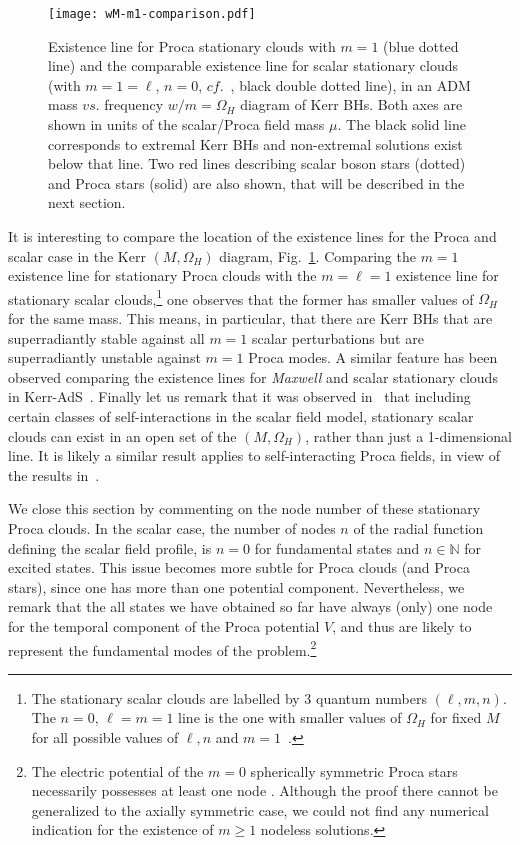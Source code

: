 \begin{figure}[h!]
  \begin{center}
    \texttt{[image: wM-m1-comparison.pdf]}
  \end{center}
 \caption{Existence line for Proca stationary clouds with $m=1$ (blue dotted line) and the comparable existence line for scalar stationary clouds (with $m=1=\ell$, $n=0$, $cf.$~\cite{Benone:2014ssa}, black double dotted line), in an ADM mass $vs.$ frequency $w/m=\Omega_H$ diagram of Kerr BHs. Both axes are shown in units of the scalar/Proca field mass $\mu$. The black solid line corresponds to extremal Kerr BHs and non-extremal solutions exist below that line. Two red lines describing scalar boson stars (dotted) and Proca stars (solid) are also shown, that will be described in the next section.}
  \label{clouds}
\end{figure}

It is interesting to compare the location of the existence lines for the Proca and scalar case in the Kerr $(M,\Omega_H)$ diagram, Fig.~\ref{clouds}. Comparing the $m=1$ existence line for stationary Proca clouds with the $m=\ell=1$ existence line for stationary scalar clouds,\footnote{The stationary scalar clouds are labelled by 3 quantum numbers $(\ell,m,n)$. The $n=0$, $\ell=m=1$ line is the one with smaller values of $\Omega_H$ for fixed $M$ for all possible values of $\ell,n$ and $m=1$~\cite{Benone:2014ssa}.} one observes that the former has smaller values of $\Omega_H$ for the same mass. This means, in particular, that there are Kerr BHs that are superradiantly stable against all $m=1$ scalar perturbations but are superradiantly unstable against $m=1$ Proca modes. A similar feature has been observed comparing the existence lines for \textit{Maxwell} and scalar stationary clouds in Kerr-AdS~\cite{Wang:2015fgp}. Finally let us remark that it was observed in~\cite{Herdeiro:2014pka} that including certain classes of self-interactions in the scalar field model, stationary scalar clouds can exist in an open set of the $(M,\Omega_H)$, rather than just a 1-dimensional line.  It is likely a similar result applies to self-interacting Proca fields, in view of the results in~\cite{Loginov:2015rya}.




We close this section by commenting on the node number of these stationary Proca clouds. 
In the scalar case, the number of nodes $n$ of the radial function defining the scalar field profile, 
is $n=0$ for fundamental states and $n\in \mathbb{N}$ for excited states. 
This issue becomes more subtle for Proca clouds (and Proca stars), 
since one has more than one potential component. Nevertheless, we remark that the all states we have obtained so far have always (only)
one node for the temporal component of the Proca potential  $V$, and thus are likely to represent the fundamental
modes of the problem.\footnote{The electric potential of the $m=0$ 
spherically symmetric Proca stars necessarily possesses at least one node \cite{Brito:2015pxa}.
Although the proof there cannot be generalized to the axially symmetric case,
we could not find any numerical indication for the existence of $m\geq 1$ nodeless solutions. 
}

